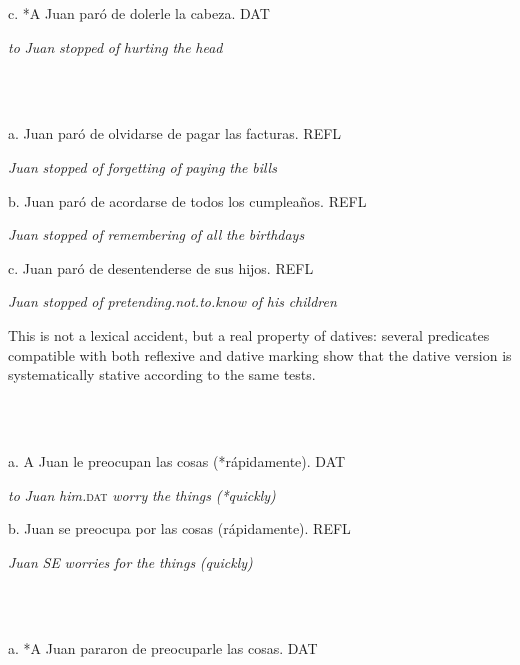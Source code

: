 \documentclass[output=paper,modfonts,nonflat]{langsci/langscibook}
\begin{document}
c. *A Juan  paró     de dolerle la   cabeza.                DAT

       \textit{to} \textit{Juan} \textit{stopped}   \textit{of} \textit{hurting} \textit{the} \textit{head}  

\ea%
    \label{ex:key:4}
    \gll\\
        \\
    \glt
    \z

            

a.   Juan paró      de olvidarse   de pagar   las facturas.          REFL

      \textit{Juan} \textit{stopped} \textit{of} \textit{forgetting} \textit{of} \textit{paying} \textit{the} \textit{bills}

b.   Juan paró      de acordarse    de todos los cumpleaños.      REFL

      \textit{Juan} \textit{stopped} \textit{of} \textit{remembering} \textit{of} \textit{all}      \textit{the} \textit{birthdays}

c.   Juan paró       de desentenderse         de sus hijos.      REFL

      \textit{Juan} \textit{stopped}   \textit{of} \textit{pretending.not.to.know}   \textit{of} \textit{his}  \textit{children}

This is not a lexical accident, but a real property of datives: several predicates compatible with both reflexive and dative marking show that the dative version is systematically stative according to the same tests.

\ea%
    \label{ex:key:5}
    \gll\\
        \\
    \glt
    \z

            a. A Juan  le       preocupan   las cosas (*rápidamente).        DAT

          \textit{to} \textit{Juan} \textit{him.}\textsc{dat} \textit{worry}      \textit{the} \textit{things} \textit{(*quickly)}

    b. Juan  se   preocupa por las cosas (rápidamente).            REFL

          \textit{Juan} \textit{SE} \textit{worries}   \textit{for}  \textit{the} \textit{things} \textit{(quickly)}

\ea%
    \label{ex:key:6}
    \gll\\
        \\
    \glt
    \z

            a. *A Juan  pararon de preocuparle las cosas.              DAT
\end{document}
